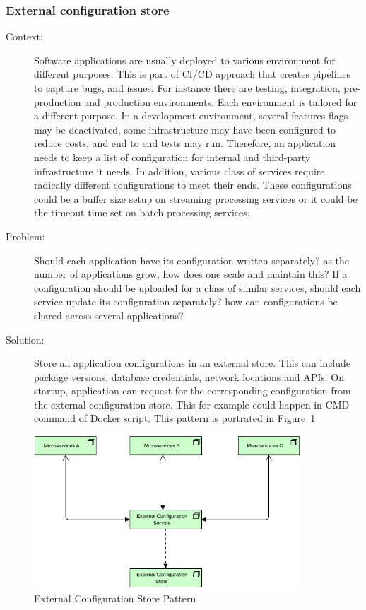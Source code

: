 \documentclass{bmcart}
\begin{document}
\subsubsection{External configuration store}

\begin{description}
  \item[Context:] Software applications are usually deployed to various environment for different purposes. This is part of CI/CD approach that creates pipelines to capture bugs, and issues. For instance there are testing, integration, pre-production and production environments. Each environment is tailored for a different purpose. In a development environment, several features flags may be deactivated, some infrastructure may have been configured to reduce costs, and end to end tests may run. Therefore, an application needs to keep a list of configuration for internal and third-party infrastructure it needs. In addition, various class of services require radically different configurations to meet their ends. These configurations could be a buffer size setup on streaming processing services or it could be the timeout time set on batch processing services. 
  \item[Problem:] Should each application have its configuration written separately? as the number of applications grow, how does one scale and maintain this? If a configuration should be uploaded for a class of similar services, should each service update its configuration separately? how can configurations be shared across several applications? 
  \item[Solution:] Store all application configurations in an external store. This can include package versions, database credentials, network locations and APIs. On startup, application can request for the corresponding configuration from the external configuration store. This for example could happen in CMD command of Docker script. This pattern is portrated in Figure~\ref{externalConfiguration}  
\end{description}

\begin{figure}[h]
  \includegraphics[width=10cm]{Media/External Configuration Store.jpg}
  \caption{External Configuration Store Pattern}
  \label{externalConfiguration}
\end{figure}
\end{document}
